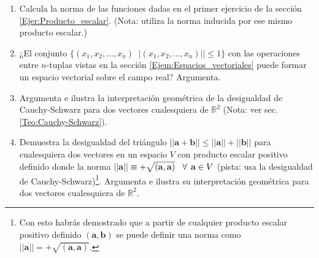 \documentclass[12pt,dvipsnames]{article}
\begin{document}
\begin{enumerate}
    \item Calcula la norma de las funciones dadas en el primer ejercicio de la sección \ref{Ejer:Producto_escalar}. (Nota: utiliza la norma inducida por ese mismo producto escalar.) 
    \item ¿El conjunto $\{(x_1,x_2,...,x_n)\mathop|\mathop x_i\in\mathbb{R} \land ||(x_1,x_2,...,x_n)||\leq1\}$ con las operaciones entre $n$-tuplas vistas en la sección \ref{Ejem:Espacios_vectoriales} puede formar un espacio vectorial sobre el campo real? Argumenta. 
    \item Argumenta e ilustra la interpretación geométrica de la desigualdad de Cauchy-Schwarz para dos vectores cualesquiera de $\mathbb{R}^2$ (Nota: ver sec. \ref{Teo:Cauchy-Schwarz}). 
    \item Demuestra la desigualdad del triángulo $||\mathbf{a}+\mathbf{b}|| \leq ||\mathbf{a}||+||\mathbf{b}||$ para cualesquiera dos vectores en un espacio $V$ con producto escalar positivo definido donde la norma $||\mathbf{a}||\equiv+\sqrt{(\mathbf{a},\mathbf{a})}\hspace{3mm}\forall\hspace{1.5mm} \mathbf{a}\in V$ (pista: usa la desigualdad de Cauchy-Schwarz)\footnote{Con esto habrás demostrado que a partir de cualquier producto escalar positivo definido $(\mathbf{a},\mathbf{b})$ se puede definir una norma como $||\mathbf{a}|| = +\sqrt{(\mathbf{a},\mathbf{a})}.$}. Argumenta e ilustra su interpretación geométrica para dos vectores cualesquiera de $\mathbb{R}^2$. 
\end{enumerate}
\end{document}
